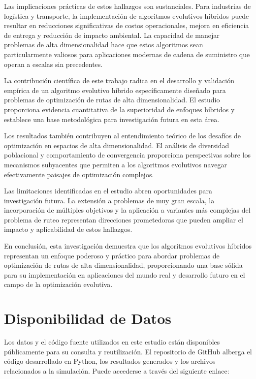 \documentclass[conference]{IEEEtran}
\begin{document}
Las implicaciones prácticas de estos hallazgos son sustanciales. Para industrias de logística y transporte, la implementación de algoritmos evolutivos híbridos puede resultar en reducciones significativas de costos operacionales, mejora en eficiencia de entrega y reducción de impacto ambiental. La capacidad de manejar problemas de alta dimensionalidad hace que estos algoritmos sean particularmente valiosos para aplicaciones modernas de cadena de suministro que operan a escalas sin precedentes.

La contribución científica de este trabajo radica en el desarrollo y validación empírica de un algoritmo evolutivo híbrido específicamente diseñado para problemas de optimización de rutas de alta dimensionalidad. El estudio proporciona evidencia cuantitativa de la superioridad de enfoques híbridos y establece una base metodológica para investigación futura en esta área.

Los resultados también contribuyen al entendimiento teórico de los desafíos de optimización en espacios de alta dimensionalidad. El análisis de diversidad poblacional y comportamiento de convergencia proporciona perspectivas sobre los mecanismos subyacentes que permiten a los algoritmos evolutivos navegar efectivamente paisajes de optimización complejos.

Las limitaciones identificadas en el estudio abren oportunidades para investigación futura. La extensión a problemas de muy gran escala, la incorporación de múltiples objetivos y la aplicación a variantes más complejas del problema de ruteo representan direcciones prometedoras que pueden ampliar el impacto y aplicabilidad de estos hallazgos.

En conclusión, esta investigación demuestra que los algoritmos evolutivos híbridos representan un enfoque poderoso y práctico para abordar problemas de optimización de rutas de alta dimensionalidad, proporcionando una base sólida para su implementación en aplicaciones del mundo real y desarrollo futuro en el campo de la optimización evolutiva.



\section{Disponibilidad de Datos}

Los datos y el código fuente utilizados en este estudio están disponibles públicamente para su consulta y reutilización. El repositorio de GitHub alberga el código desarrollado en Python, los resultados generados y los archivos relacionados a la simulación. Puede accederse a través del siguiente enlace:
\end{document}
